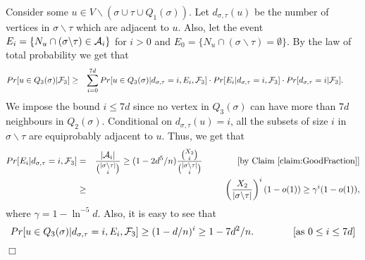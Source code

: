 \documentclass[a4paper,10pt]{article}
\makeatletter
\newenvironment{claimproof}[1]{\noindent{\bf Proof of Claim #1\@:}}{\hfill $\Box$\\}
\makeatother
\begin{document}
\begin{claimproof}{\ref{Lemma:Q3}}
Consider some $u\in V \backslash (\sigma \cup \tau \cup Q_1(\sigma))$.
Let $d_{\sigma,\tau}(u)$ be the number of vertices in $\sigma
\backslash \tau$ which are adjacent to $u$. Also, let 
the event $E_i=\{N_u\cap (\sigma\backslash\tau)\in {\cal A}_i\}$ for $i>0$
and $E_0=\{N_u\cap (\sigma\backslash\tau)=\emptyset\}$.
By the law of total probability we get that
\begin{eqnarray}
Pr[u \in Q_3(\sigma)|{\cal F}_3] 
&\geq& \sum_{i=0}^{7d}Pr[u\in Q_3(\sigma)|d_{\sigma,\tau}=i, E_i, {\cal F}_3]
\cdot Pr[E_i|d_{\sigma,\tau}=i,{\cal F}_3]  \cdot Pr[d_{\sigma,\tau}=i|{\cal F}_3].
\qquad \label{eq:PruQ3FirstBound}
\end{eqnarray}
We impose the bound $i\leq 7d$  since no vertex in $Q_3(\sigma)$
can have more than $7d$ neighbours in $Q_2(\sigma)$.
Conditional on $d_{\sigma, \tau}(u)=i$,  all the
subsets of size $i$ in $\sigma \backslash \tau$ are equiprobably adjacent to $u$.
Thus, we get that
\begin{eqnarray}
Pr[E_i|d_{\sigma,\tau}=i,{\cal F}_3]&=&\frac{|{\cal A}_i|}{{|\sigma\backslash \tau|\choose i}}
\geq (1-2d^5/n)\frac{{X_2\choose i}}{{|\sigma\backslash \tau|\choose i}} 
\qquad \qquad \mbox{[by Claim \ref{claim:GoodFraction}]} 
\nonumber \\
&\geq& \left( \frac{X_2}
{|\sigma\backslash \tau|}\right)^i(1-o(1))\geq  \gamma^i(1-o(1)),
\label{eq:4TargetOneH1}
\end{eqnarray}
where $\gamma=1-\ln^{-5} d$. Also, it is easy to see that 
\begin{equation}
Pr[u\in Q_3(\sigma)|d_{\sigma,\tau}=i, E_i, {\cal F}_3]\geq (1-d/n)^i\geq 1-7d^2/n.
\qquad \qquad \mbox{[as $0\leq i\leq 7d$]}
\label{eq:Target1stBound}
\end{equation}



\end{claimproof}
\end{document}
